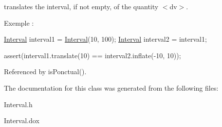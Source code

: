 translates the interval, if not empty, of the quantity {\ttfamily $<$dv$>$}.

Exemple \+: 
\begin{DoxyCode}
\hyperlink{classHurricane_1_1Interval_a02b04ad7ca380422098992fa8ff5f546}{Interval} interval1 = \hyperlink{classHurricane_1_1Interval_a02b04ad7ca380422098992fa8ff5f546}{Interval}(10, 100);
\hyperlink{classHurricane_1_1Interval_a02b04ad7ca380422098992fa8ff5f546}{Interval} interval2 = interval1;
 
assert(interval1.translate(10) == interval2.inflate(-10, 10));
\end{DoxyCode}
 

Referenced by is\+Ponctual().



The documentation for this class was generated from the following files\+:\begin{DoxyCompactItemize}
\item 
Interval.\+h\item 
Interval.\+dox\end{DoxyCompactItemize}
